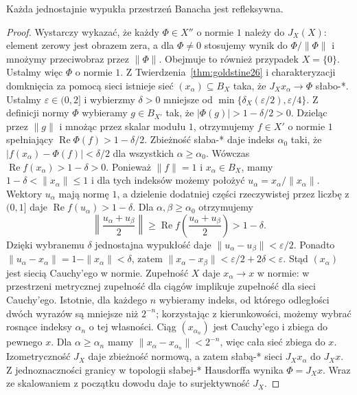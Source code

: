\begin{twierdzenie}
\label{thm:milman-pettis26}
Każda jednostajnie wypukła przestrzeń Banacha jest refleksywna.
\end{twierdzenie}
\begin{proof}
Wystarczy wykazać, że każdy $\Phi\in X''$ o normie $1$
należy do $J_X(X)$: element zerowy jest obrazem zera,
a dla $\Phi\ne0$ stosujemy wynik do $\Phi/\|\Phi\|$
i mnożymy przeciwobraz przez $\|\Phi\|$.
Obejmuje to również przypadek $X=\{0\}$.
Ustalmy więc $\Phi$ o normie $1$.
Z Twierdzenia~\ref{thm:goldstine26} i charakteryzacji
domknięcia za pomocą sieci istnieje sieć
$(x_\alpha)\subseteq B_X$ taka, że
$J_Xx_\alpha\to\Phi$ słabo-*.
Ustalmy $\varepsilon\in(0,2]$ i wybierzmy
$\delta>0$ mniejsze od $\min\{\delta_X(\varepsilon/2),\varepsilon/4\}$.
Z definicji normy $\Phi$ wybieramy $g\in B_{X'}$
tak, że $|\Phi(g)|>1-\delta/2>0$.
Dzieląc przez $\|g\|$ i mnożąc przez skalar modułu $1$,
otrzymujemy $f\in X'$ o normie $1$ spełniający
$\operatorname{Re}\Phi(f)>1-\delta/2$.
Zbieżność słaba-* daje indeks $\alpha_0$ taki, że
$|f(x_\alpha)-\Phi(f)|<\delta/2$ dla wszystkich
$\alpha\ge\alpha_0$. Wówczas
$\operatorname{Re}f(x_\alpha)>1-\delta>0$.
Ponieważ $\|f\|=1$ i $x_\alpha\in B_X$, mamy
$1-\delta<\|x_\alpha\|\le1$ i dla tych indeksów
możemy położyć $u_\alpha=x_\alpha/\|x_\alpha\|$.
Wektory $u_\alpha$ mają normę $1$, a dzielenie
dodatniej części rzeczywistej przez liczbę z $(0,1]$
daje $\operatorname{Re}f(u_\alpha)>1-\delta$.
Dla $\alpha,\beta\ge\alpha_0$ otrzymujemy
\[
 \left\|\frac{u_\alpha+u_\beta}{2}\right\|
 \ge\operatorname{Re}f\left(\frac{u_\alpha+u_\beta}{2}\right)
 >1-\delta.
\]
Dzięki wybranemu $\delta$ jednostajna wypukłość daje
$\|u_\alpha-u_\beta\|<\varepsilon/2$.
Ponadto $\|u_\alpha-x_\alpha\|=1-\|x_\alpha\|<\delta$,
zatem $\|x_\alpha-x_\beta\|<\varepsilon/2+2\delta<\varepsilon$.
Stąd $(x_\alpha)$ jest siecią Cauchy'ego w normie.
Zupełność $X$ daje $x_\alpha\to x$ w normie:
w przestrzeni metrycznej zupełność dla ciągów
implikuje zupełność dla sieci Cauchy'ego.
Istotnie, dla każdego $n$ wybieramy indeks,
od którego odległości dwóch wyrazów są mniejsze
niż $2^{-n}$; korzystając z kierunkowości, możemy
wybrać rosnące indeksy $\alpha_n$ o tej własności.
Ciąg $(x_{\alpha_n})$ jest Cauchy'ego i zbiega
do pewnego $x$. Dla $\alpha\ge\alpha_n$
mamy $\|x_\alpha-x_{\alpha_n}\|<2^{-n}$,
więc cała sieć zbiega do $x$.
Izometryczność $J_X$ daje zbieżność normową,
a zatem słabą-* sieci $J_Xx_\alpha$ do $J_Xx$.
Z jednoznaczności granicy w topologii słabej-*
Hausdorffa wynika $\Phi=J_Xx$.
Wraz ze skalowaniem z początku dowodu daje to
surjektywność $J_X$.
\end{proof}

